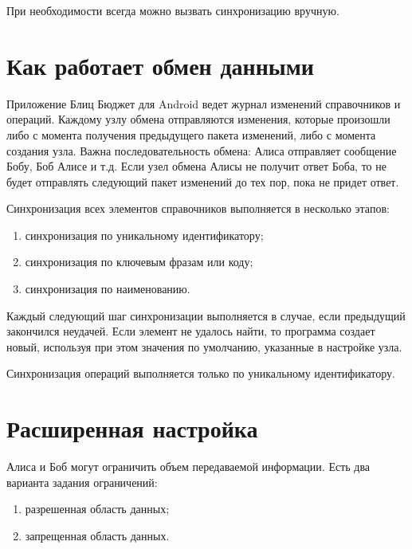 \documentclass[a4paper,10pt,russian]{sphinxmanual}
\begin{document}
\sphinxAtStartPar
При необходимости всегда можно вызвать синхронизацию вручную.


\section{Как работает обмен данными}
\label{\detokenize{teamwork:id7}}
\sphinxAtStartPar
Приложение Блиц Бюджет для Android ведет журнал изменений справочников и операций. Каждому узлу обмена отправляются изменения,
которые произошли либо с момента получения предыдущего пакета изменений, либо с момента создания узла.
Важна последовательность обмена: Алиса отправляет сообщение Бобу, Боб \sphinxhyphen{} Алисе и т.д. Если узел обмена Алисы не
получит ответ Боба, то не будет отправлять следующий пакет изменений до тех пор, пока не придет ответ.

\sphinxAtStartPar
Синхронизация всех элементов справочников выполняется в несколько этапов:
\begin{enumerate}
%
\item {} 
\sphinxAtStartPar
синхронизация по уникальному идентификатору;

\item {} 
\sphinxAtStartPar
синхронизация по ключевым фразам или коду;

\item {} 
\sphinxAtStartPar
синхронизация по наименованию.

\end{enumerate}

\sphinxAtStartPar
Каждый следующий шаг синхронизации выполняется в случае, если предыдущий закончился неудачей. Если элемент
не удалось найти, то программа создает новый, используя при этом значения по умолчанию, указанные в настройке узла.

\sphinxAtStartPar
Синхронизация операций выполняется только по уникальному идентификатору.


\section{Расширенная настройка}
\label{\detokenize{teamwork:id8}}
\sphinxAtStartPar
Алиса и Боб могут ограничить объем передаваемой информации. Есть два варианта задания ограничений:
\begin{enumerate}
%
\item {} 
\sphinxAtStartPar
разрешенная область данных;

\item {} 
\sphinxAtStartPar
запрещенная область данных.

\end{enumerate}
\end{document}
